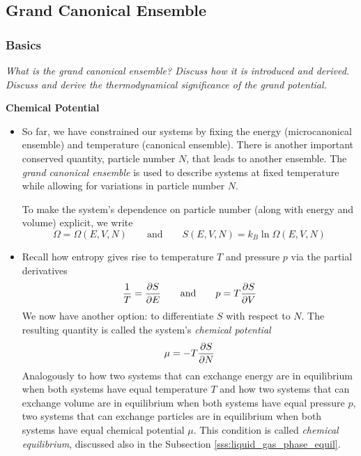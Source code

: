 \documentclass[11pt, a4paper]{article}
\begin{document}
\subsection{Grand Canonical Ensemble}
\subsubsection{Basics}
\textit{What is the grand canonical ensemble? Discuss how it is introduced and derived. Discuss and derive the thermodynamical significance of the grand potential.}

\smallskip
\textbf{Chemical Potential}
\begin{itemize}	
	\item So far, we have constrained our systems by fixing the energy (microcanonical ensemble) and temperature (canonical ensemble). There is another important conserved quantity, particle number $ N $, that leads to another ensemble. The \textit{grand canonical ensemble} is used to describe systems at fixed temperature while allowing for variations in particle number $ N $.
	
	To make the system's dependence on particle number (along with energy and volume) explicit, we write
	\begin{equation*}
		\Omega = \Omega(E, V, N) \qquad \text{and} \qquad S(E, V, N) = k_{B}\ln \Omega(E, V, N)
	\end{equation*}
	
	\item Recall how entropy gives rise to temperature $ T $ and pressure $ p $ via the partial derivatives
	\begin{equation*}
		\frac{1}{T} = \pdv{S}{E} \qquad \text{and} \qquad p = T \pdv{S}{V}
	\end{equation*}
	We now have another option: to differentiate $ S $ with respect to $ N $. The resulting quantity is called the system's \textit{chemical potential}
	\begin{equation*}
		\mu = - T\pdv{S}{N}
	\end{equation*}
	Analogously to how two systems that can exchange energy are in equilibrium when both systems have equal temperature $ T $ and how two systems that can exchange volume are in equilibrium when both systems have equal pressure $ p $, two systems that can exchange particles are in equilibrium when both systems have equal chemical potential $ \mu $. This condition is called \textit{chemical equilibrium}, discussed also in the Subsection \ref{sss:liquid_gas_phase_equil}.
	

\end{itemize}
\end{document}
